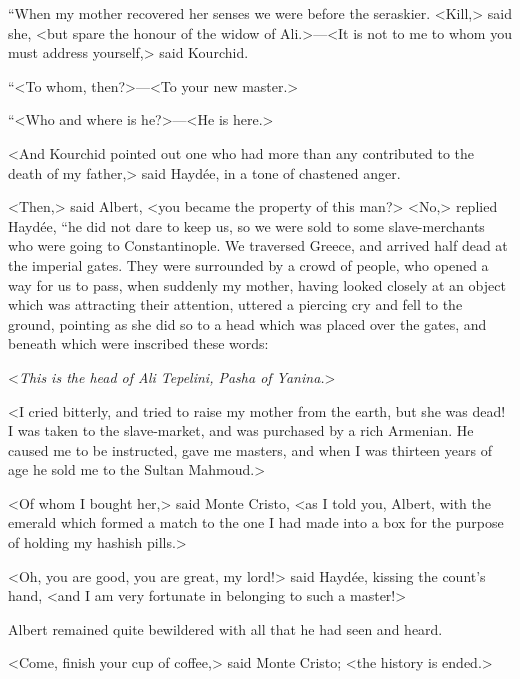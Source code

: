  “When my mother recovered her senses we were before the seraskier. <Kill,> said she, <but spare the honour of the widow of Ali.>—<It is not to me to whom you must address yourself,> said Kourchid. 

 “<To whom, then?>—<To your new master.> 

 “<Who and where is he?>—<He is here.> 

 <And Kourchid pointed out one who had more than any contributed to the death of my father,> said Haydée, in a tone of chastened anger. 

 <Then,> said Albert, <you became the property of this man?>  <No,> replied Haydée, “he did not dare to keep us, so we were sold to some slave-merchants who were going to Constantinople. We traversed Greece, and arrived half dead at the imperial gates. They were surrounded by a crowd of people, who opened a way for us to pass, when suddenly my mother, having looked closely at an object which was attracting their attention, uttered a piercing cry and fell to the ground, pointing as she did so to a head which was placed over the gates, and beneath which were inscribed these words: 

 <\textit{This is the head of Ali Tepelini, Pasha of Yanina.}> 

 <I cried bitterly, and tried to raise my mother from the earth, but she was dead! I was taken to the slave-market, and was purchased by a rich Armenian. He caused me to be instructed, gave me masters, and when I was thirteen years of age he sold me to the Sultan Mahmoud.> 

 <Of whom I bought her,> said Monte Cristo, <as I told you, Albert, with the emerald which formed a match to the one I had made into a box for the purpose of holding my hashish pills.> 

 <Oh, you are good, you are great, my lord!> said Haydée, kissing the count's hand, <and I am very fortunate in belonging to such a master!> 

 Albert remained quite bewildered with all that he had seen and heard. 

 <Come, finish your cup of coffee,> said Monte Cristo; <the history is ended.> 